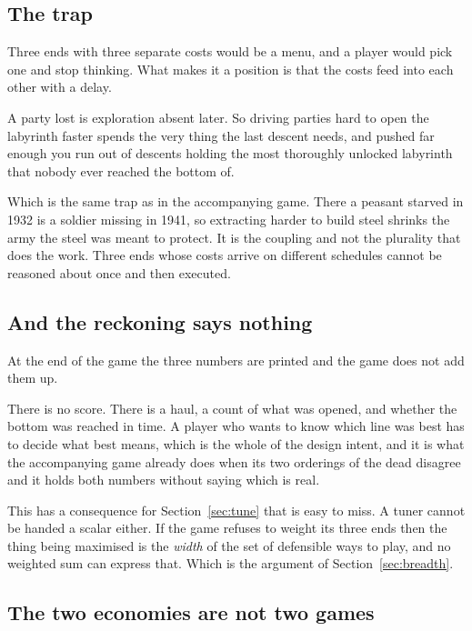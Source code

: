 \documentclass[11pt,a4paper]{article}
\begin{document}
\subsection{The trap}

Three ends with three separate costs would be a menu, and a player would pick one and stop
thinking. What makes it a position is that the costs feed into each other with a delay.

A party lost is exploration absent later. So driving parties hard to open the labyrinth faster
spends the very thing the last descent needs, and pushed far enough you run out of descents
holding the most thoroughly unlocked labyrinth that nobody ever reached the bottom of.

\begin{sectionbox}
Which is the same trap as in the accompanying game. There a peasant starved in 1932 is a soldier
missing in 1941, so extracting harder to build steel shrinks the army the steel was meant to
protect. It is the coupling and not the plurality that does the work. Three ends whose costs
arrive on different schedules cannot be reasoned about once and then executed.
\end{sectionbox}

\subsection{And the reckoning says nothing}

At the end of the game the three numbers are printed and the game does not add them up.

There is no score. There is a haul, a count of what was opened, and whether the bottom was
reached in time. A player who wants to know which line was best has to decide what best means,
which is the whole of the design intent, and it is what the accompanying game already does when
its two orderings of the dead disagree and it holds both numbers without saying which is real.

\begin{alarmbox}
This has a consequence for Section~\ref{sec:tune} that is easy to miss. A tuner cannot be handed a
scalar either. If the game refuses to weight its three ends then the thing being maximised is the
\emph{width} of the set of defensible ways to play, and no weighted sum can express that. Which
is the argument of Section~\ref{sec:breadth}.
\end{alarmbox}

\subsection{The two economies are not two games}
\end{document}
